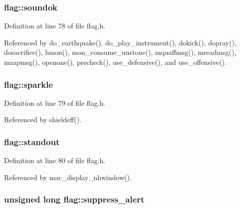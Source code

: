 \hypertarget{structflag_ae3871fd2268fbc24b89cece8eb352dfc}{
\subsubsection[{soundok}]{ flag\+::soundok}}\label{structflag_ae3871fd2268fbc24b89cece8eb352dfc}


Definition at line 78 of file flag.\+h.



Referenced by do\+\_\+earthquake(), do\+\_\+play\+\_\+instrument(), dokick(), dopray(), dosacrifice(), hmon(), mon\+\_\+consume\+\_\+unstone(), mquaffmsg(), mreadmsg(), mzapmsg(), openone(), precheck(), use\+\_\+defensive(), and use\+\_\+offensive().

\hypertarget{structflag_aad9ec28d2a285d53e5ef9a6eb9696183}{
\subsubsection[{sparkle}]{ flag\+::sparkle}}\label{structflag_aad9ec28d2a285d53e5ef9a6eb9696183}


Definition at line 79 of file flag.\+h.



Referenced by shieldeff().

\hypertarget{structflag_a6c912e940e53382cfd6a39e56bd1c2ee}{
\subsubsection[{standout}]{ flag\+::standout}}\label{structflag_a6c912e940e53382cfd6a39e56bd1c2ee}


Definition at line 80 of file flag.\+h.



Referenced by mac\+\_\+display\+\_\+nhwindow().

\hypertarget{structflag_ab558d0d3ed4a3952a137452df27c7c64}{
\subsubsection[{suppress\+\_\+alert}]{\setlength{\rightskip}{0pt plus 5cm}unsigned long flag\+::suppress\+\_\+alert}}\label{structflag_ab558d0d3ed4a3952a137452df27c7c64}


